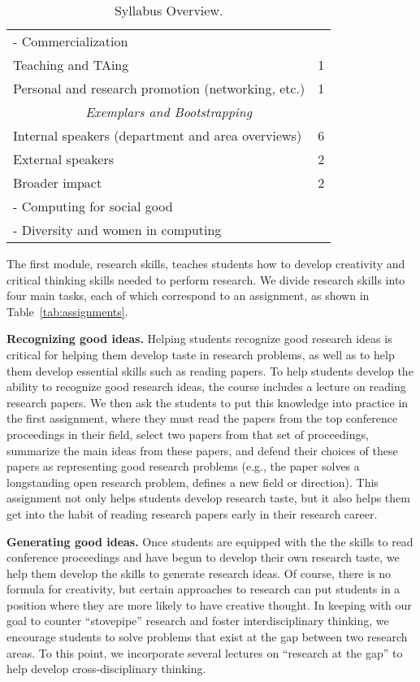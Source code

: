 \begin{table}[t]
\begin{center}
\begin{small}
\begin{tabular}{p{2.5in}|r}
- Commercialization \\
Teaching and TAing & 1 \\
Personal and research promotion (networking, etc.) & 1 \\ \hline
\multicolumn{2}{c}{{\em Exemplars and Bootstrapping}} \\ \hline
Internal speakers (department and area overviews) & 6 \\ 
External speakers & 2 \\
Broader impact & 2 \\
- Computing for social good & \\
- Diversity and women in computing & \\
\end{tabular}
\end{small}
\end{center}
\vspace*{-0.1in}
\caption{Syllabus Overview.}
\vspace*{-0.2in}
\label{tab:syllabus}
\end{table}

The first module, research skills, teaches students how to develop
creativity and critical thinking skills needed to perform research.  We
divide research skills into four main tasks, each of which correspond to
an assignment, as shown in Table~\ref{tab:assignments}.

\vspace*{0.1in}
\noindent
{\bf Recognizing good ideas.}  Helping students recognize good research ideas
is critical for helping them develop taste in research problems, as well
as to help them develop essential skills such as reading papers.  To
help students develop the ability to recognize good research ideas, the
course includes a lecture on reading research papers.  We then ask the
students to put this knowledge into practice in the first assignment,
where they must read the papers from the top conference proceedings in
their field, select two papers from that set of proceedings, summarize
the main ideas from these papers, and defend their choices of these
papers as representing good research problems (e.g., the paper solves a
longstanding open research problem, defines a new field or direction).
This assignment not only helps students develop research taste, but it
also helps them get into the habit of reading research papers early in
their research career.

\vspace*{0.1in}
\noindent
{\bf Generating good ideas.}  Once students are equipped with the the skills
to read conference proceedings and have begun to develop their own
research taste, we help them develop the skills to generate research
ideas.  Of course, there is no formula for creativity, but certain
approaches to research can put students in a position where they are
more likely to have creative thought.  In keeping with our goal to
counter ``stovepipe'' research and foster interdisciplinary thinking, we
encourage students to solve problems that exist at the gap between two
research areas.  To this point, we incorporate several lectures on
``research at the gap'' to help develop cross-disciplinary thinking.

